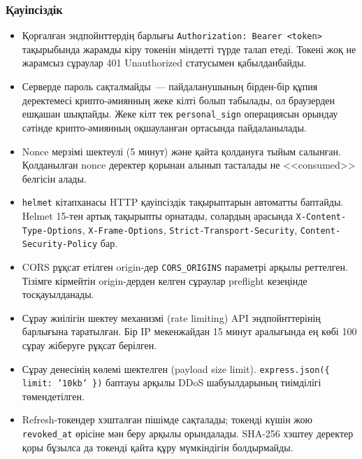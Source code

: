 \documentclass[14pt,a4paper]{extarticle}
\begin{document}
\subsubsection{Қауіпсіздік}
\begin{itemize}[nosep]
\item Қорғалған эндпойнттердің барлығы \texttt{Authorization: Bearer <token>} тақырыбында жарамды кіру токенін міндетті түрде талап етеді. Токені жоқ не жарамсыз сұраулар 401 Unauthorized статусымен қабылданбайды.
\item Серверде пароль сақталмайды~--- пайдаланушының бірден-бір құпия деректемесі крипто-әмиянның жеке кілті болып табылады, ол браузерден ешқашан шықпайды. Жеке кілт тек \texttt{personal\_sign} операциясын орындау сәтінде крипто-әмиянның оқшауланған ортасында пайдаланылады.
\item Nonce мерзімі шектеулі (5 минут) және қайта қолдануға тыйым салынған. Қолданылған nonce деректер қорынан алынып тасталады не <<consumed>> белгісін алады.
\item \texttt{helmet} кітапханасы HTTP қауіпсіздік тақырыптарын автоматты баптайды. Helmet 15-тен артық тақырыпты орнатады, солардың арасында \texttt{X-Content-Type-Options}, \texttt{X-Frame-Options}, \texttt{Strict-Transport-Security}, \texttt{Content-Security-Policy} бар.
\item CORS рұқсат етілген origin-дер \texttt{CORS\_ORIGINS} параметрі арқылы реттелген. Тізімге кірмейтін origin-дерден келген сұраулар preflight кезеңінде тосқауылданады.
\item Сұрау жиілігін шектеу механизмі (rate limiting) API эндпойнттерінің барлығына таратылған. Бір IP мекенжайдан 15 минут аралығында ең көбі 100 сұрау жіберуге рұқсат берілген.
\item Сұрау денесінің көлемі шектелген (payload size limit). \texttt{express.json(\{ limit: '10kb' \})} баптауы арқылы DDoS шабуылдарының тиімділігі төмендетілген.
\item Refresh-токендер хэшталған пішімде сақталады; токенді күшін жою \texttt{revoked\_at} өрісіне мән беру арқылы орындалады. SHA-256 хэштеу деректер қоры бұзылса да токенді қайта құру мүмкіндігін болдырмайды.
\end{itemize}
\end{document}
